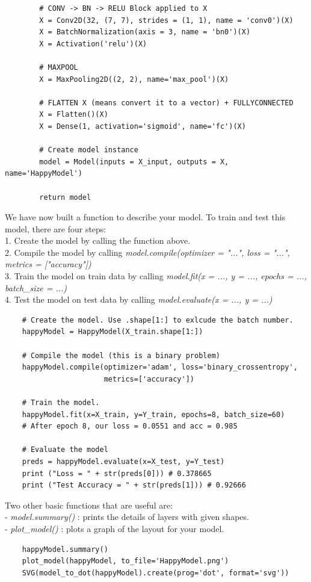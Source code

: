 \documentclass[11pt, a4paper]{article}
\begin{document}
\begin{spacing}{1.1}
\begin{lstlisting}
		# CONV -> BN -> RELU Block applied to X
		X = Conv2D(32, (7, 7), strides = (1, 1), name = 'conv0')(X)
		X = BatchNormalization(axis = 3, name = 'bn0')(X)
		X = Activation('relu')(X)
		
		# MAXPOOL
		X = MaxPooling2D((2, 2), name='max_pool')(X)
		
		# FLATTEN X (means convert it to a vector) + FULLYCONNECTED
		X = Flatten()(X)
		X = Dense(1, activation='sigmoid', name='fc')(X)
		
		# Create model instance
		model = Model(inputs = X_input, outputs = X, name='HappyModel')
		
		return model	\end{lstlisting} \vspace*{1mm}
	We have now built a function to describe your model. To train and test this model, there are four steps:\\
	1. Create the model by calling the function above.\\	
	2. Compile the model by calling \textit{model.compile(optimizer = "...", loss = "...", metrics = ["accuracy"])}\\	
	3. Train the model on train data by calling \textit{model.fit(x = ..., y = ..., epochs = ..., batch\_size = ...)}\\ 
	4. Test the model on test data by calling \textit{model.evaluate(x = ..., y = ...)} 
	\begin{lstlisting}
	# Create the model. Use .shape[1:] to exlcude the batch number.
	happyModel = HappyModel(X_train.shape[1:])
	
	# Compile the model (this is a binary problem)
	happyModel.compile(optimizer='adam', loss='binary_crossentropy', 
	                   metrics=['accuracy'])
	                   
	# Train the model.
	happyModel.fit(x=X_train, y=Y_train, epochs=8, batch_size=60)
	# After epoch 8, our loss = 0.0551 and acc = 0.985
	
	# Evaluate the model
	preds = happyModel.evaluate(x=X_test, y=Y_test)
	print ("Loss = " + str(preds[0])) # 0.378665
	print ("Test Accuracy = " + str(preds[1])) # 0.92666  \end{lstlisting} \vspace*{1mm}
	Two other basic functions that are useful are: \\
	- \textit{model.summary()} : prints the details of layers with given shapes. \\
	- \textit{plot\_model()} : plots a graph of the layout for your model.
	\begin{lstlisting}
	happyModel.summary()
	plot_model(happyModel, to_file='HappyModel.png')
	SVG(model_to_dot(happyModel).create(prog='dot', format='svg')) \end{lstlisting} \newpage


\end{spacing}
\end{document}
